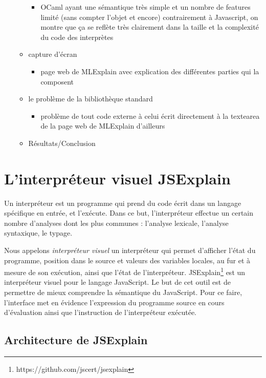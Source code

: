 \documentclass{easychair}
\begin{document}
\begin{itemize}
\begin{itemize}
    \begin{itemize}
    \item OCaml ayant une sémantique très simple et un nombre de features limité (sans compter l'objet et encore) contrairement à Javascript, on montre que ça se reflète très clairement dans la taille et la complexité du code des interprètes
    \end{itemize}
  \item capture d'écran
    \begin{itemize}
    \item page web de MLExplain avec explication des différentes parties qui la composent
    \end{itemize}
  \item le problème de la bibliothèque standard
    \begin{itemize}
    \item problème de tout code externe à celui écrit directement à la textearea de la page web de MLExplain d'ailleurs
    \end{itemize}
  \item Résultats/Conclusion
  \end{itemize}
\end{itemize}

\section{L'interpréteur visuel JSExplain}

Un interpréteur est un programme qui prend du code écrit dans un langage 
spécifique en entrée, et l'exécute. Dans ce but, l'interpréteur effectue un 
certain nombre d'analyses dont les plus communes : l'analyse lexicale, 
l'analyse syntaxique, le typage.

Nous appelons \emph{interpréteur visuel} un interpréteur qui permet d'afficher
l'état du programme, position dans le source et valeurs des variables locales,
au fur et à mesure de son exécution, ainsi que l'état de l'interpréteur.
JSExplain\footnote{https://github.com/jscert/jsexplain} est un interpréteur
visuel pour le langage JavaScript. Le but de cet outil est de permettre de mieux
comprendre la sémantique du JavaScript. Pour ce faire, l'interface met en
évidence l'expression du programme source en cours d'évaluation ainsi que
l'instruction de l'interpréteur exécutée.

\subsection{Architecture de JSExplain}
\end{document}
